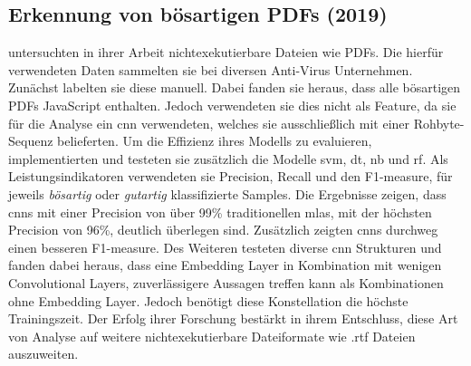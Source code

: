\documentclass[
    12pt, %
    DIV10,
    ngerman, %
    a4paper, %
    oneside, %
    titlepage, %
    parskip=half, %
    headings=normal, %
    listof=totoc, %
    bibliography=totoc, %
    index=totoc, %
    captions=tableheading, %
    final %
]{scrreprt}
\begin{document}
\subsection{Erkennung von bösartigen PDFs (2019)}
\textcite{Jeong2019} untersuchten in ihrer Arbeit nichtexekutierbare Dateien wie PDFs. Die hierfür verwendeten Daten sammelten sie bei diversen Anti-Virus Unternehmen. Zunächst labelten sie diese manuell. Dabei fanden sie heraus, dass alle bösartigen PDFs JavaScript enthalten. Jedoch verwendeten sie dies nicht als Feature, da sie für die Analyse ein \ac{cnn} verwendeten, welches sie ausschließlich mit einer Rohbyte-Sequenz belieferten. Um die Effizienz ihres Modells zu evaluieren, implementierten und testeten sie zusätzlich die Modelle \ac{svm}, \ac{dt}, \acl{nb} und \ac{rf}. Als Leistungsindikatoren verwendeten sie Precision, Recall und den F1-measure, für jeweils \emph{bösartig} oder \emph{gutartig} klassifizierte Samples. Die Ergebnisse zeigen, dass \ac{cnns} mit einer Precision von über 99\% traditionellen \ac{mlas}, mit der höchsten Precision von 96\%, deutlich überlegen sind. Zusätzlich zeigten \ac{cnns} durchweg einen besseren F1-measure. Des Weiteren testeten \citeauthor{Jeong2019} diverse \ac{cnn} Strukturen und fanden dabei heraus, dass eine Embedding Layer in Kombination mit wenigen Convolutional Layers, zuverlässigere Aussagen treffen kann als Kombinationen ohne Embedding Layer. Jedoch benötigt diese Konstellation die höchste Trainingszeit. Der Erfolg ihrer Forschung bestärkt \citeauthor{Jeong2019} in ihrem Entschluss, diese Art von Analyse auf weitere nichtexekutierbare Dateiformate wie .rtf Dateien auszuweiten.
%
\end{document}
